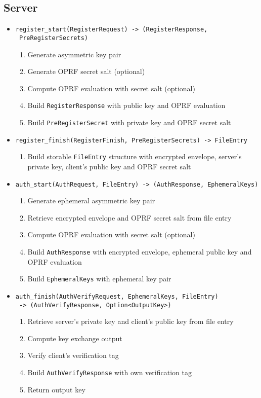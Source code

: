 \documentclass[../report.tex]{subfiles}
\begin{document}
\subsection{Server}
\begin{itemize}
 \item \verb|register_start(RegisterRequest) -> (RegisterResponse,|\\
       \verb| PreRegisterSecrets)|
  \begin{enumerate}
    \item Generate asymmetric key pair
    \item Generate OPRF secret salt (optional)
    \item Compute OPRF evaluation with secret salt (optional)
    \item Build \verb|RegisterResponse| with public key and OPRF evaluation
    \item Build \verb|PreRegisterSecret| with private key and OPRF secret salt
  \end{enumerate}
  
 \item \verb|register_finish(RegisterFinish, PreRegisterSecrets) -> FileEntry|
  \begin{enumerate}
    \item Build storable \verb|FileEntry| structure with encrypted envelope, server's private key, client's public key and OPRF secret salt
  \end{enumerate}
  
  
  
 \item \verb|auth_start(AuthRequest, FileEntry) -> (AuthResponse, EphemeralKeys)|
  \begin{enumerate}
    \item Generate ephemeral asymmetric key pair
    \item Retrieve encrypted envelope and OPRF secret salt from file entry
    \item Compute OPRF evaluation with secret salt (optional)
    \item Build \verb|AuthResponse| with encrypted envelope, ephemeral public key and OPRF evaluation
    \item Build \verb|EphemeralKeys| with ephemeral key pair
  \end{enumerate}
  
 \item \verb|auth_finish(AuthVerifyRequest, EphemeralKeys, FileEntry)|\\ 
       \verb| -> (AuthVerifyResponse, Option<OutputKey>)|
  \begin{enumerate}
    \item Retrieve server's private key and client's public key from file entry
    \item Compute key exchange output
    \item Verify client's verification tag
    \item Build \verb|AuthVerifyResponse| with own verification tag
    \item Return output key
  \end{enumerate}
  
\end{itemize}
\end{document}

